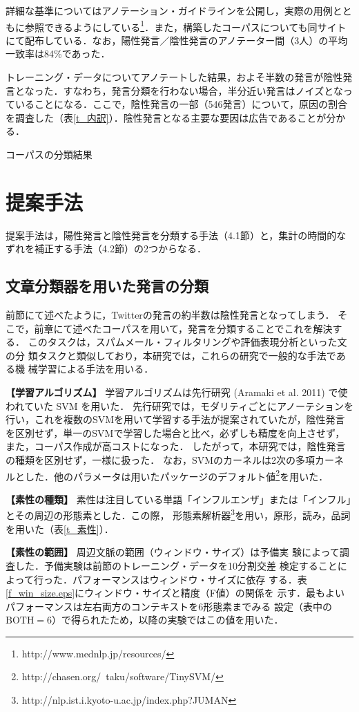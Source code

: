 \documentclass[japanese]{jnlp_1.4}
\begin{document}
詳細な基準についてはアノテーション・ガイドラインを公開し，実際の用例とともに参照できるようにしている\footnote{http://www.mednlp.jp/resources/}．また，構築したコーパスについても同サイトにて配布している．なお，陽性発言／陰性発言のアノテーター間（3人）の平均一致率は84\%であった．

トレーニング・データについてアノテートした結果，およそ半数の発言が陰性発言となった．すなわち，発言分類を行わない場合，半分近い発言はノイズとなっていることになる．ここで，陰性発言の一部（546発言）について，原因の割合を調査した（表\ref{t_内訳}）．陰性発言となる主要な要因は広告であることが分かる．

\begin{table}[t]
\caption{コーパスの分類結果}
\label{t_内訳}

\end{table}


\section{提案手法}

提案手法は，陽性発言と陰性発言を分類する手法（4.1節）と，集計の時間的なずれを補正する手法（4.2節）の2つからなる．

\subsection{文章分類器を用いた発言の分類}

前節にて述べたように，Twitterの発言の約半数は陰性発言となってしまう．
そこで，前章にて述べたコーパスを用いて，発言を分類することでこれを解決する．
このタスクは，スパムメール・フィルタリングや評価表現分析といった文の分
類タスクと類似しており，本研究では，これらの研究で一般的な手法である機
械学習による手法を用いる．

\begin{description}
\item {\bf 【学習アルゴリズム】} 
学習アルゴリズムは先行研究 (Aramaki et al. 2011) で使われていた SVM を用いた．
先行研究では，モダリティごとにアノーテションを行い，これを複数のSVMを用いて学習する手法が提案されていたが，陰性発言を区別せず，単一のSVMで学習した場合と比べ，必ずしも精度を向上させず，また，コーパス作成が高コストになった．
したがって，本研究では，陰性発言の種類を区別せず，一様に扱った．
なお，SVMのカーネルは2次の多項カーネルとした．他のパラメータは用いたパッケージのデフォルト値\footnote{http://chasen.org/~taku/software/TinySVM/}を用いた．
\item {\bf 【素性の種類】}
素性は注目している単語「インフルエンザ」または「インフル」とその周辺の形態素とした．この際，
形態素解析器\footnote{http://nlp.ist.i.kyoto-u.ac.jp/index.php?JUMAN}を用い，原形，読み，品詞を用いた（表\ref{t_素性}）．
\item {\bf 【素性の範囲】} 周辺文脈の範囲（ウィンドウ・サイズ）は予備実
  験によって調査した．予備実験は前節のトレーニング・データを10分割交差
  検定することによって行った．パフォーマンスはウィンドウ・サイズに依存
  する．表\ref{f_win_size.eps}にウィンドウ・サイズと精度（F値）の関係を
  示す．最もよいパフォーマンスは左右両方のコンテキストを6形態素までみる
  設定（表中の $\text{BOTH}=6$）で得られたため，以降の実験ではこの値を用いた．
\end{description}
\end{document}
